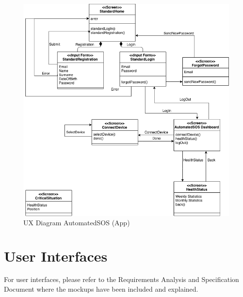 \begin{figure}[H]
  \begin{center}
  	\includegraphics[width=0.68\paperwidth]{./img/UXDiagram/UX_Diagram_AutomatedSOS_App.png}
    \hspace{0.05\linewidth}
    \centering
    \caption{UX Diagram AutomatedSOS (App)}
		\label{img:AutomatedSOSApp}
    \end{center}
\end{figure}

\section{User Interfaces}
For user interfaces, please refer to the Requirements Analysis and Specification Document where the mockups have been included and explained.
